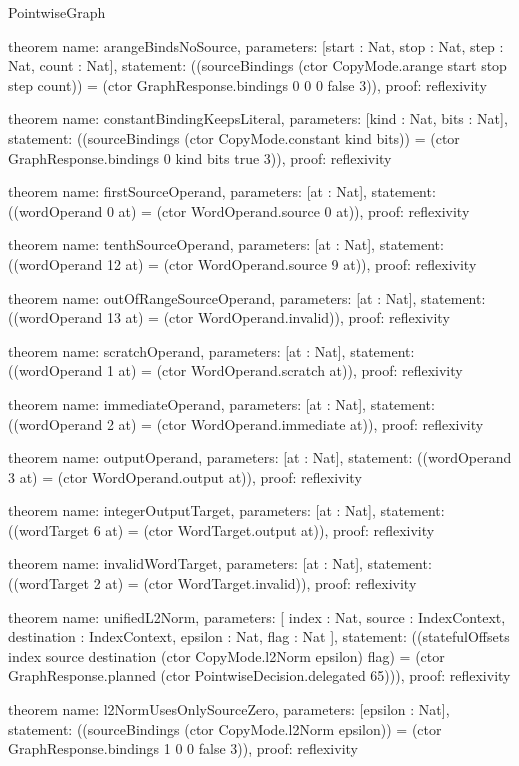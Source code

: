 \begin{lexlean}{PointwiseGraph}
\begin{semanticmodule}
theorem{
  name: arangeBindsNoSource,
  parameters: [start : Nat, stop : Nat, step : Nat, count : Nat],
  statement: ((sourceBindings (ctor CopyMode.arange start stop step count)) = (ctor GraphResponse.bindings 0 0 0 false 3)),
  proof: reflexivity{}
}

theorem{
  name: constantBindingKeepsLiteral,
  parameters: [kind : Nat, bits : Nat],
  statement: ((sourceBindings (ctor CopyMode.constant kind bits)) = (ctor GraphResponse.bindings 0 kind bits true 3)),
  proof: reflexivity{}
}

theorem{
  name: firstSourceOperand,
  parameters: [at : Nat],
  statement: ((wordOperand 0 at) = (ctor WordOperand.source 0 at)),
  proof: reflexivity{}
}

theorem{
  name: tenthSourceOperand,
  parameters: [at : Nat],
  statement: ((wordOperand 12 at) = (ctor WordOperand.source 9 at)),
  proof: reflexivity{}
}

theorem{
  name: outOfRangeSourceOperand,
  parameters: [at : Nat],
  statement: ((wordOperand 13 at) = (ctor WordOperand.invalid)),
  proof: reflexivity{}
}

theorem{
  name: scratchOperand,
  parameters: [at : Nat],
  statement: ((wordOperand 1 at) = (ctor WordOperand.scratch at)),
  proof: reflexivity{}
}

theorem{
  name: immediateOperand,
  parameters: [at : Nat],
  statement: ((wordOperand 2 at) = (ctor WordOperand.immediate at)),
  proof: reflexivity{}
}

theorem{
  name: outputOperand,
  parameters: [at : Nat],
  statement: ((wordOperand 3 at) = (ctor WordOperand.output at)),
  proof: reflexivity{}
}

theorem{
  name: integerOutputTarget,
  parameters: [at : Nat],
  statement: ((wordTarget 6 at) = (ctor WordTarget.output at)),
  proof: reflexivity{}
}

theorem{
  name: invalidWordTarget,
  parameters: [at : Nat],
  statement: ((wordTarget 2 at) = (ctor WordTarget.invalid)),
  proof: reflexivity{}
}

theorem{
  name: unifiedL2Norm,
  parameters: [
    index : Nat,
    source : IndexContext,
    destination : IndexContext,
    epsilon : Nat,
    flag : Nat
  ],
  statement: ((statefulOffsets index source destination (ctor CopyMode.l2Norm epsilon) flag) = (ctor GraphResponse.planned (ctor PointwiseDecision.delegated 65))),
  proof: reflexivity{}
}

theorem{
  name: l2NormUsesOnlySourceZero,
  parameters: [epsilon : Nat],
  statement: ((sourceBindings (ctor CopyMode.l2Norm epsilon)) = (ctor GraphResponse.bindings 1 0 0 false 3)),
  proof: reflexivity{}
}


\end{semanticmodule}
\end{lexlean}
